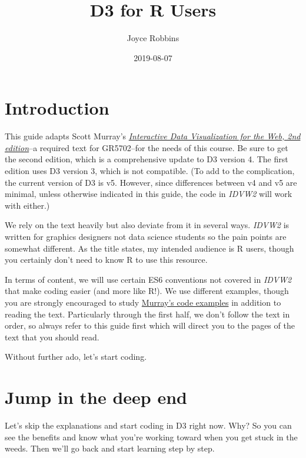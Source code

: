 \documentclass[]{book}
\title{D3 for R Users}
\author{Joyce Robbins}
\date{2019-08-07}
\begin{document}
\maketitle

{
\setcounter{tocdepth}{1}
\tableofcontents
}
\hypertarget{introduction}{%
\chapter{Introduction}\label{introduction}}

This guide adapts Scott Murray's \href{https://www.amazon.com/Interactive-Data-Visualization-Web-Introduction/dp/1491921285/}{\emph{Interactive Data Visualization for the Web, 2nd edition}}--a required text for GR5702--for the needs of this course. Be sure to get the second edition, which is a comprehensive update to D3 version 4. The first edition uses D3 version 3, which is not compatible. (To add to the complication, the current version of D3 is v5. However, since differences between v4 and v5 are minimal, unless otherwise indicated in this guide, the code in \emph{IDVW2} will work with either.)

We rely on the text heavily but also deviate from it in several ways. \emph{IDVW2} is written for graphics designers not data science students so the pain points are somewhat different. As the title states, my intended audience is R users, though you certainly don't need to know R to use this resource.

In terms of content, we will use certain ES6 conventions not covered in \emph{IDVW2} that make coding easier (and more like R!). We use different examples, though you are strongly encouraged to study \href{https://github.com/alignedleft/d3-book/releases}{Murray's code examples} in addition to reading the text. Particularly through the first half, we don't follow the text in order, so always refer to this guide first which will direct you to the pages of the text that you should read.

Without further ado, let's start coding.

\hypertarget{jump-in-the-deep-end}{%
\chapter{Jump in the deep end}\label{jump-in-the-deep-end}}

Let's skip the explanations and start coding in D3 right now. Why? So you can see the benefits and know what you're working toward when you get stuck in the weeds. Then we'll go back and start learning step by step.
\end{document}
